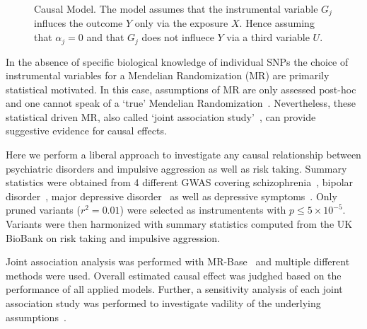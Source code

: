 \begin{figure}[!h]
  \centering
  \resizebox{0.5\textwidth}{!}{}
  \caption{Causal Model.
    The model assumes that the instrumental variable $G_j$ influces the outcome $Y$ only via the exposure $X$.
    Hence assuming that $\alpha_j=0$ and that $G_j$ does not influece $Y$ via a third variable $U$. 
  }\label{fig:causal}
\end{figure}


In the absence of specific biological knowledge of individual SNPs the choice of instrumental variables for a Mendelian Randomization (MR) are primarily statistical motivated.
In this case, assumptions of MR are only assessed post-hoc and one cannot speak of a `true' Mendelian Randomization~\cite{Burgess2016a}.
Nevertheless, these statistical driven MR, also called `joint association study'~\cite{Burgess2016a}, can provide suggestive evidence for causal effects.

Here we perform a liberal approach to investigate any causal relationship between psychiatric disorders and impulsive aggression as well as risk taking.
Summary statistics were obtained from 4 different GWAS covering schizophrenia~\cite{Ripke2014}, bipolar disorder~\cite{PsychiatricGWASConsortiumBipolarDisorderWorkingGroup2011}, major depressive disorder~\cite{MajorDepressiveDisorderWorkingGroupofthePsychiatricGWASConsortium2013} as well as depressive symptoms~\cite{Okbay2016}.
Only pruned variants ($r^2=0.01$) were selected as instrumentents with $p\leq 5\times 10^{-5}$.
Variants were then harmonized with summary statistics computed from the UK BioBank on risk taking and impulsive aggression. 

Joint association analysis was performed with MR-Base~\cite{Hemani2016} and multiple different methods were used.
Overall estimated causal effect was judghed based on the performance of all applied models.
Further, a sensitivity analysis of each joint association study was performed to investigate vadility of the underlying assumptions~\cite{Burgess2016}.  
